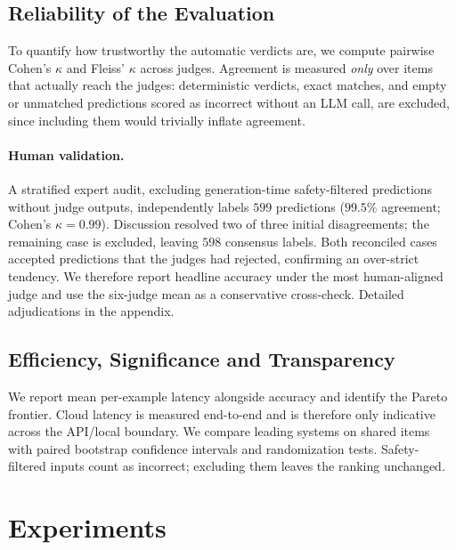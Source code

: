 \subsection{Reliability of the Evaluation}
To quantify how trustworthy the automatic verdicts are, we compute pairwise Cohen's $\kappa$ and Fleiss' $\kappa$ across judges. Agreement is measured \emph{only} over items that actually reach the judges: deterministic verdicts, exact matches, and empty or unmatched predictions scored as incorrect without an LLM call, are excluded, since including them would trivially inflate agreement.

\paragraph{Human validation.} A stratified expert audit, excluding generation-time safety-filtered predictions without judge outputs, independently labels $599$ predictions ($99.5\%$ agreement; Cohen's $\kappa=0.99$). Discussion resolved two of three initial disagreements; the remaining case is excluded, leaving $598$ consensus labels. Both reconciled cases accepted predictions that the judges had rejected, confirming an over-strict tendency. We therefore report headline accuracy under the most human-aligned judge and use the six-judge mean as a conservative cross-check. Detailed adjudications in the appendix.

\subsection{Efficiency, Significance and Transparency}
We report mean per-example latency alongside accuracy and identify the Pareto frontier. Cloud latency is measured end-to-end and is therefore only indicative across the API/local boundary. We compare leading systems on shared items with paired bootstrap confidence intervals and randomization tests. Safety-filtered inputs count as incorrect; excluding them leaves the ranking unchanged.



\section{Experiments}
\label{sec:experiments}

